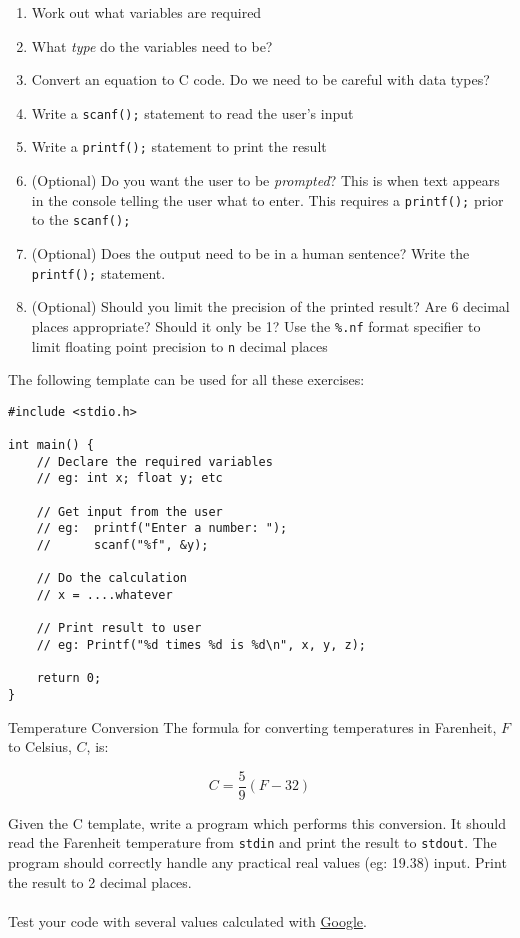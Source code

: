 \documentclass{lab}
\begin{document}
\begin{enumerate}
\item Work out what variables are required
\item What \textit{type} do the variables need to be?
\item Convert an equation to C code. Do we need to be careful with data types?
\item Write a \texttt{scanf();} statement to read the user's input
\item Write a \texttt{printf();} statement to print the result
\item (Optional) Do you want the user to be \textit{prompted}? This is when text appears in the console telling the user what to enter. This requires a \texttt{printf();} prior to the \texttt{scanf();}
\item (Optional) Does the output need to be in a human sentence? Write the \texttt{printf();} statement.
\item (Optional) Should you limit the precision of the printed result? Are 6 decimal places appropriate? Should it only be 1? Use the \texttt{\%.nf} format specifier to limit floating point precision to \texttt{n} decimal places
\end{enumerate}

The following template can be used for all these exercises:

\begin{lstlisting}[style=CStyle]
#include <stdio.h>

int main() {
	// Declare the required variables 
	// eg: int x; float y; etc	
	
	// Get input from the user
	// eg: 	printf("Enter a number: ");
	// 		scanf("%f", &y);	
	
	// Do the calculation
	// x = ....whatever
	
	// Print result to user
	// eg: Printf("%d times %d is %d\n", x, y, z);
		
	return 0;
}
\end{lstlisting}

\pagebreak
\begin{task}{Temperature Conversion}{}
The formula for converting temperatures in Farenheit, $F$ to Celsius, $C$, is:

\begin{equation}\label{eq:temp}
C = \frac{5}{9}(F - 32)
\end{equation}

Given the C template, write a program which performs this conversion. It should read the Farenheit temperature from \texttt{stdin} and print the result to \texttt{stdout}. The program should correctly handle any practical real values (eg: 19.38) input. Print the result to 2 decimal places.
\\ \\
Test your code with several values calculated with \underline{\href{https://www.google.com.au/search?q=farenheit+to+celsius}{Google}}.
\end{task}
\end{document}
